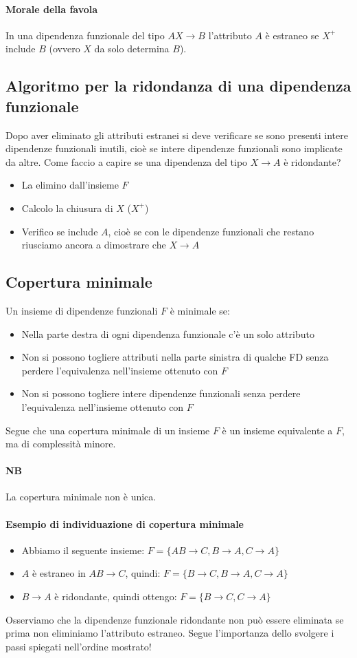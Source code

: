 \paragraph{Morale della favola} In una dipendenza funzionale del tipo $AX \to B$ l'attributo $A$ è estraneo se $X^+$ include $B$ (ovvero $X$ da solo determina $B$).
\subsection{Algoritmo per la ridondanza di una dipendenza funzionale}
Dopo aver eliminato gli attributi estranei si deve verificare se sono presenti intere dipendenze funzionali inutili, cioè se intere dipendenze funzionali sono implicate da altre. Come faccio a capire se una dipendenza del tipo $X \to A$ è ridondante?
\begin{itemize}
	\item La elimino dall'insieme $F$
	\item Calcolo la chiusura di $X$ ($X^+$)
	\item Verifico se include $A$, cioè se con le dipendenze funzionali che restano riusciamo ancora a dimostrare che $X \to A$
\end{itemize}
\subsection{Copertura minimale}
Un insieme di dipendenze funzionali $F$ è minimale se:
\begin{itemize}
	\item Nella parte destra di ogni dipendenza funzionale c'è un solo attributo
	\item Non si possono togliere attributi nella parte sinistra di qualche FD senza perdere l'equivalenza nell'insieme ottenuto con $F$
	\item Non si possono togliere intere dipendenze funzionali senza perdere l'equivalenza nell'insieme ottenuto con $F$
\end{itemize}
Segue che una copertura minimale di un insieme $F$ è un insieme equivalente a $F$, ma di complessità minore.
\paragraph{NB} La copertura minimale non è unica.
\paragraph{Esempio di individuazione di copertura minimale} 
\begin{itemize}
	\item Abbiamo il seguente insieme: $F=\{ AB \to C, B \to A, C \to A \}$
	\item $A$ è estraneo in $AB \to C$, quindi: $F=\{ B \to C, B \to A, C \to A \}$
	\item $B\to A$ è ridondante, quindi ottengo: $F=\{ B \to C, C \to A \}$
\end{itemize}
Osserviamo che la dipendenze funzionale ridondante non può essere eliminata se prima non eliminiamo l'attributo estraneo. Segue l'importanza dello svolgere i passi spiegati nell'ordine mostrato!